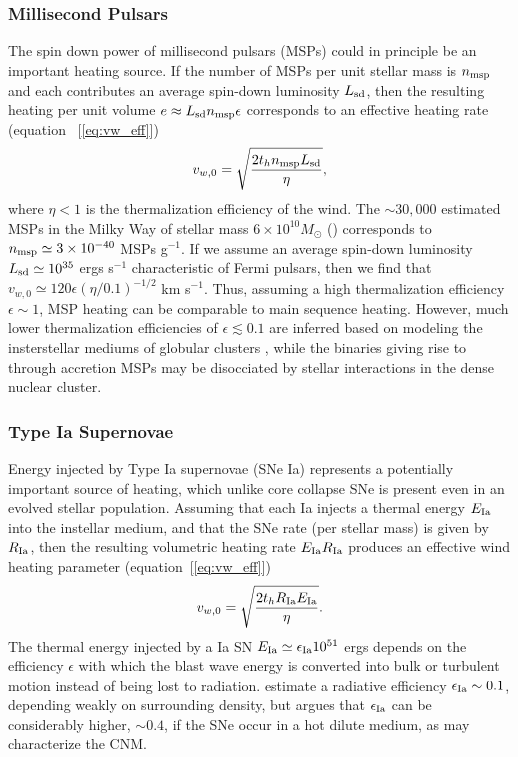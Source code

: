 \documentclass[usenatbib,fleqn]{mn2e}
\newcommand{\vwO}{v_{w,0}}
\begin{document}
\subsubsection{Millisecond Pulsars} The spin down power of millisecond pulsars (MSPs) could in principle be an important heating source.  If the number of MSPs per unit stellar mass is $n_{\rm msp}$ and each contributes an average spin-down luminosity $L_{\rm sd}$, then the resulting heating per unit volume $e \approx L_{\rm sd}n_{\rm msp}\epsilon$ corresponds to an effective heating rate (equation~ [\ref{eq:vw_eff}])
  \begin{align}
    \vwO=\sqrt{\frac{2 t_h n_{\rm msp} L_{\rm sd}}{\eta}},
  \end{align}
where $\eta < 1$ is the thermalization efficiency of the wind.  The $\sim 30,000$ estimated MSPs in the Milky Way of stellar mass $6\times 10^{10}M_{\odot}$ (\citealt{Lorimer13}) corresponds to $n_{\rm msp}\simeq3 \times 10^{-40} $ MSPs g$^{-1}$.  If we assume an average spin-down luminosity $L_{\rm sd}\simeq 10^{35}$ ergs s$^{-1}$ characteristic of Fermi pulsars, then we find that $\vwO\simeq 120\epsilon (\eta/0.1)^{-1/2}$ km s$^{-1}$.  Thus, assuming a high thermalization efficiency $\epsilon \sim 1$, MSP heating can be comparable to main sequence heating.  However, much lower thermalization efficiencies of $\epsilon \lesssim 0.1$ are inferred based on modeling the insterstellar mediums of globular clusters \citep{NaimanSoares-Furtado+:2013a}, while the binaries giving rise to through accretion MSPs may be disocciated by stellar interactions in the dense nuclear cluster.  
\subsubsection{Type Ia Supernovae} 

Energy injected by Type Ia supernovae (SNe Ia) represents a potentially important source of heating, which unlike core collapse SNe is present even in an evolved stellar population.  Assuming that each Ia injects a thermal energy $E_{\rm Ia}$ into the instellar medium, and that the SNe rate (per stellar mass) is given by $R_{\rm Ia}$, then the resulting volumetric heating rate $E_{\rm Ia}R_{\rm Ia}$ produces an effective wind heating parameter (equation~[\ref{eq:vw_eff}])
\begin{align}
    \vwO=\sqrt{\frac{2 t_h R_{\rm Ia} E_{\rm Ia}}{\eta}} \label{eq:vw_sne}.
\end{align}
The thermal energy injected by a Ia SN $E_{\rm Ia} \simeq \epsilon_{\rm Ia} 10^{51}$ ergs depends on the efficiency $\epsilon$ with which the blast wave energy is converted into bulk or turbulent motion instead of being lost to radiation.  \cite{Thornton+98} estimate a radiative efficiency $\epsilon_{\rm Ia} \sim 0.1$, depending weakly on surrounding density, but \citet{Sharma+14} argues that $\epsilon_{\rm Ia}$ can be considerably higher, $\sim 0.4$, if the SNe occur in a hot dilute medium, as may characterize the CNM.
\end{document}
